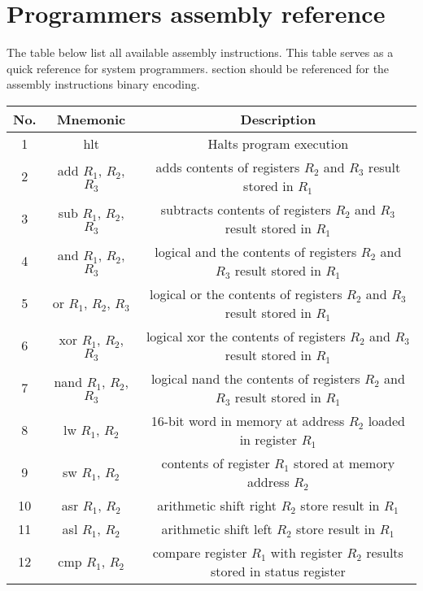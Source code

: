 \documentclass{article}
\begin{document}
\section{Programmers assembly reference}
\label{progref}
The table below list all available assembly instructions. This table serves as a quick reference for system programmers.  section should be referenced for the assembly instructions binary encoding. 
\begin{par}
	\begin{center}
		\begin{tabular}{|c|c|c|}
			\hline
			\textbf{No.} & \textbf{Mnemonic} & \textbf{Description} \\
			\hline 
			1 & hlt & Halts program execution \\
			\hline 
			2 & add $ R_{1} $, $ R_{2} $, $ R_{3} $ & adds contents of registers $ R_{2} $ and $ R_{3} $ result stored in $ R_{1} $ \\
			\hline
			3 & sub $ R_{1} $, $ R_{2} $, $ R_{3} $ & subtracts contents of registers $ R_{2} $ and $ R_{3} $ result stored in $ R_{1} $ \\
			\hline
			4 & and $ R_{1} $, $ R_{2} $, $ R_{3} $ & logical and the contents of registers $ R_{2} $ and $ R_{3} $ result stored in $ R_{1} $ \\
			\hline
			5 & or $ R_{1} $, $ R_{2} $, $ R_{3} $ & logical or the contents of registers $ R_{2} $ and $ R_{3} $ result stored in $ R_{1} $ \\
			\hline
			6 & xor $ R_{1} $, $ R_{2} $, $ R_{3} $ & logical xor the contents of registers $ R_{2} $ and $ R_{3} $ result stored in $ R_{1} $ \\
			\hline
			7 & nand $ R_{1} $, $ R_{2} $, $ R_{3} $ & logical nand the contents of registers $ R_{2} $ and $ R_{3} $ result stored in $ R_{1} $ \\
			\hline
			8 & lw $ R_{1} $, $ R_{2} $ & 16-bit word in memory at address $ R_{2} $ loaded in register $ R_{1} $ \\
			\hline
			9 & sw $ R_{1} $, $ R_{2} $ & contents of register $ R_{1} $ stored at memory address $ R_{2} $ \\
			\hline
			10 & asr $ R_{1} $, $ R_{2} $ & arithmetic shift right $ R_{2} $ store result in $ R_{1} $ \\
			\hline
			11 & asl $ R_{1} $, $ R_{2} $ & arithmetic shift left $ R_{2} $ store result in $ R_{1} $ \\
			\hline
			12 & cmp $ R_{1} $, $ R_{2} $ & compare register $ R_{1} $ with register $ R_{2} $ results stored in status register \\

\end{tabular}
\end{center}
\end{par}
\end{document}
